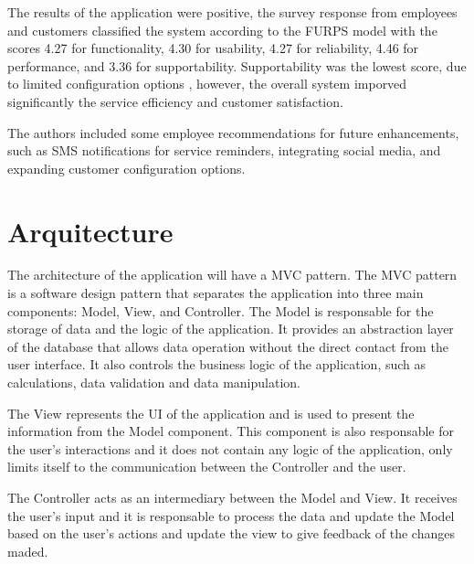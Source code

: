 The results of the application were positive, the survey response from employees and customers classified the system according to the \ac{FURPS} model with the scores 4.27 for functionality, 4.30 for usability, 4.27 for reliability, 4.46 for performance, and 3.36 for supportability.
Supportability was the lowest score, due to limited configuration options \cite{MARS_MOTORS}, however, the overall system imporved significantly the service efficiency and customer satisfaction. \cite{MARS_MOTORS}

The authors included some employee recommendations for future enhancements, such as SMS notifications for service reminders, integrating social media, and expanding customer configuration options.


\section{Arquitecture}

The architecture of the application will have a \ac{MVC} pattern. 
The \ac{MVC} pattern is a software design pattern that separates the application into three main components: Model, View, and Controller.\cite{mvc_geeksforgeeks} \cite{MVC_StartupHouse}
The Model is responsable for the storage of data and the logic of the application.  \cite{mvc_geeksforgeeks} \cite{MVC_StartupHouse}
It provides an abstraction layer of the database that allows data operation without the direct contact from the user interface. \cite{MVC_StartupHouse}
It also controls the business logic of the application, such as calculations, data validation and data manipulation. \cite{MVC_StartupHouse}

The View represents the \ac{UI} of the application and is used to present the information from the Model component. \cite{mvc_geeksforgeeks} \cite{MVC_StartupHouse}
This component is also responsable for the user's interactions and it does not contain any logic of the application, only limits itself to the communication between the Controller and the user. \cite{MVC_StartupHouse}

The Controller acts as an intermediary between the Model and View.
It receives the user's input and it is responsable to process the data and update the Model based on the user's actions and update the view to give feedback of the changes maded. \cite{mvc_geeksforgeeks} \cite{MVC_StartupHouse}

